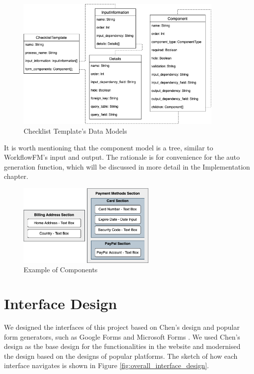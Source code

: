 \begin{figure}[ht!]
    \centering
    \includegraphics[width=0.9\textwidth]{overleaf/images/data_models.png}
    \caption{Checklist Template's Data Models}
    \label{fig:data_models}
\end{figure}

It is worth mentioning that the component model is a tree, similar to WorkflowFM's input and output. The rationale is for convenience for the auto generation function, which will be discussed in more detail in the Implementation chapter.

\begin{figure}[ht!]
    \centering
    \includegraphics[width=0.6\textwidth]{overleaf/images/component_example.png}
    \caption{Example of Components}
    \label{fig:component_example}
\end{figure}

\section{Interface Design}
\label{interface_design}
We designed the interfaces of this project based on Chen's design \cite{checklistdesign} and popular form generators, such as Google Forms \cite{googleforms} and Microsoft Forms \cite{msforms}. We used Chen's design as the base design for the functionalities in the website and modernised the design based on the designs of popular platforms. The sketch of how each interface navigates is shown in Figure \ref{fig:overall_interface_design}.

